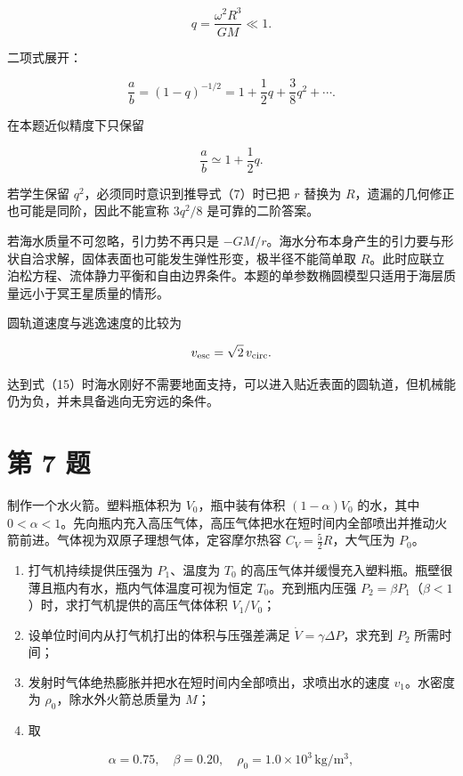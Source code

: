 \documentclass[12pt,a4paper,UTF8]{ctexart}
\newcommand{\tightlist}{\setlength{\itemsep}{0pt}\setlength{\parskip}{0pt}}
\begin{document}
\[
q=\frac{\omega^2R^3}{GM}\ll1.
\]

二项式展开：

\[
\frac ab=(1-q)^{-1/2}
=1+\frac12q+\frac38q^2+\cdots.
\]

在本题近似精度下只保留

\[
\frac ab\simeq1+\frac12q.
\]

若学生保留 \(q^2\)，必须同时意识到推导式（7）时已把 \(r\) 替换为
\(R\)，遗漏的几何修正也可能是同阶，因此不能宣称 \(3q^2/8\)
是可靠的二阶答案。

若海水质量不可忽略，引力势不再只是
\(-GM/r\)。海水分布本身产生的引力要与形状自洽求解，固体表面也可能发生弹性形变，极半径不能简单取
\(R\)。此时应联立泊松方程、流体静力平衡和自由边界条件。本题的单参数椭圆模型只适用于海层质量远小于冥王星质量的情形。

圆轨道速度与逃逸速度的比较为

\[
v_{\rm esc}=\sqrt2\,v_{\rm circ}.
\]

达到式（15）时海水刚好不需要地面支持，可以进入贴近表面的圆轨道，但机械能仍为负，并未具备逃向无穷远的条件。

\newpage

\section{第 7 题}\label{ux7b2c-7-ux9898}

制作一个水火箭。塑料瓶体积为 \(V_0\)，瓶中装有体积 \((1-\alpha)V_0\)
的水，其中
\(0<\alpha<1\)。先向瓶内充入高压气体，高压气体把水在短时间内全部喷出并推动火箭前进。气体视为双原子理想气体，定容摩尔热容
\(C_V=\frac52R\)，大气压为 \(P_0\)。

\begin{enumerate}
\def\labelenumi{\arabic{enumi}.}
\tightlist
\item
  打气机持续提供压强为 \(P_1\)、温度为 \(T_0\)
  的高压气体并缓慢充入塑料瓶。瓶壁很薄且瓶内有水，瓶内气体温度可视为恒定
  \(T_0\)。充到瓶内压强
  \(P_2=\beta P_1\)（\(\beta<1\)）时，求打气机提供的高压气体体积
  \(V_1/V_0\)；
\item
  设单位时间内从打气机打出的体积与压强差满足
  \(\dot V=\gamma\Delta P\)，求充到 \(P_2\) 所需时间；
\item
  发射时气体绝热膨胀并把水在短时间内全部喷出，求喷出水的速度
  \(v_1\)。水密度为 \(\rho_0\)，除水外火箭总质量为 \(M\)；
\item
  取
\end{enumerate}

\[
\alpha=0.75,\quad
\beta=0.20,\quad
\rho_0=1.0\times10^3\,\mathrm{kg/m^3},
\]
\end{document}
